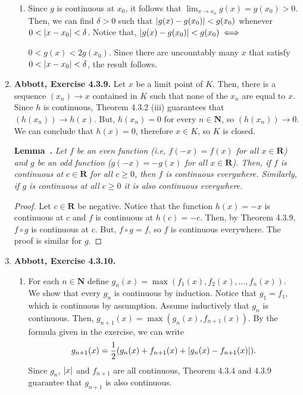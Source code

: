 \documentclass{article}
\newcounter{lemmaCounter}
\newenvironment{shortlemma}{\refstepcounter{lemmaCounter}
\noindent\textbf{Lemma~\thelemmaCounter.}\em}
\DeclarePairedDelimiter\abs{\lvert}{\rvert}
\newcommand{\N}{\mathbf{N}}
\newcommand{\R}{\mathbf{R}}
\newcommand{\exc}[2][Abbott]{\item \textbf{#1, Exercise #2.}}
\let\oldmax\max
\renewcommand{\max}[1]{\oldmax \left( #1 \right)}
\begin{document}
\begin{enumerate}
\begin{enumerate}
        \item Since $g$ is continuous at $x_0$, it follows that $\lim_{x \to x_0} g(x) = g(x_0) > 0$. Then, we can find $\delta > 0$ such that $\abs{g(x)-g(x_0)} < g(x_0)$ whenever $0 < \abs{x-x_0} < \delta$. Notice that,  $\abs{g(x)-g(x_0)} < g(x_0) \iff$
        
        \noindent $0 < g(x) < 2g(x_0)$. Since there are uncountably many $x$ that satisfy $0 < \abs{x-x_0} < \delta$, the result follows.
    \end{enumerate}
    
    \exc{4.3.9}
    Let $x$ be a limit point of $K$. Then, there is a sequence $(x_n) \to x$ contained in $K$ such that none of the $x_n$ are equal to $x$. Since $h$ is continuous, Theorem 4.3.2 (iii) guarantees that $(h(x_n)) \to h(x)$. But, $h(x_n) = 0$ for every $n \in \N$, so $(h(x_n)) \to 0$. We can conclude that $h(x) = 0$, therefore $x \in K$, so $K$ is closed.
    
    \begin{shortlemma} \label{lem_evenOddContinuous}
        Let $f$ be an even function (i.e, $f(-x) = f(x)$ for all $x \in \R$) and $g$ be an odd function ($g(-x) = -g(x)$ for all $x \in \R$). Then, if $f$ is continuous at $c \in \R$ for all $c \geq 0$, then $f$ is continuous everywhere. Similarly, if $g$ is continuous at all $c \geq 0$ it is also continuous everywhere.
    \end{shortlemma}
    
    \begin{proof}
         Let $c \in \R$ be negative. Notice that the function $h(x)=-x$ is continuous at $c$ and $f$ is continuous at $h(c)=-c$. Then, by Theorem 4.3.9, $f \circ g$ is continuous at $c$. But, $f \circ g = f$, so $f$ is continuous everywhere. The proof is similar for $g$.
    \end{proof}
    
    \exc{4.3.10}
    \begin{enumerate}
        \item For each $n \in \N$ define $g_n(x) = \max{f_1(x), f_2(x), \dots, f_n(x)}$. We show that every $g_n$ is continuous by induction. Notice that $g_1 = f_1$, which is continuous by assumption. Assume inductively that $g_n$ is continuous. Then, $g_{n+1}(x) = \max{g_n(x),f_{n+1}(x)}$. By the formula given in the exercise, we can write 
        $$ g_{n+1}(x) = \frac{1}{2} (g_n(x)+f_{n+1}(x) + \abs{g_n(x)-f_{n+1}(x)}).$$ Since $g_n$, $\abs{x}$ and $f_{n+1}$ are all continuous, Theorem 4.3.4 and 4.3.9 guarantee that $g_{n+1}$ is also continuous.
        

\end{enumerate}
\end{enumerate}
\end{document}
